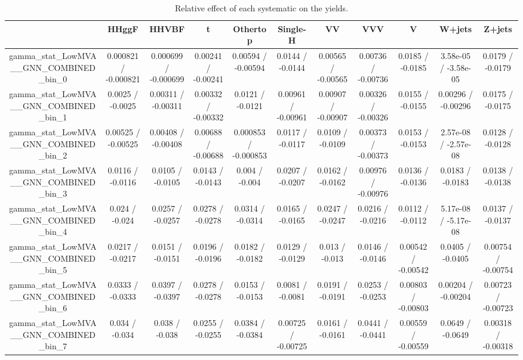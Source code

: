 \documentclass[10pt]{article}
\begin{document}
\begin{table}[htbp]
\begin{center}
\begin{tabular}{|c|c|c|c|c|c|c|c|c|c|c|}
\hline 
      & HHggF      & HHVBF      & t      & Othertop      & Single-H      & VV      & VVV      & V      & W+jets      & Z+jets \\ 
\hline 
  gamma_stat_LowMVA__GNN_COMBINED_bin_0 & 0.000821 / -0.000821 & 0.000699 / -0.000699 & 0.00241 / -0.00241 & 0.00594 / -0.00594 & 0.0144 / -0.0144 & 0.00565 / -0.00565 & 0.00736 / -0.00736 & 0.0185 / -0.0185 & 3.58e-05 / -3.58e-05 & 0.0179 / -0.0179 \\ 
  gamma_stat_LowMVA__GNN_COMBINED_bin_1 & 0.0025 / -0.0025 & 0.00311 / -0.00311 & 0.00332 / -0.00332 & 0.0121 / -0.0121 & 0.00961 / -0.00961 & 0.00907 / -0.00907 & 0.00326 / -0.00326 & 0.0155 / -0.0155 & 0.00296 / -0.00296 & 0.0175 / -0.0175 \\ 
  gamma_stat_LowMVA__GNN_COMBINED_bin_2 & 0.00525 / -0.00525 & 0.00408 / -0.00408 & 0.00688 / -0.00688 & 0.000853 / -0.000853 & 0.0117 / -0.0117 & 0.0109 / -0.0109 & 0.00373 / -0.00373 & 0.0153 / -0.0153 & 2.57e-08 / -2.57e-08 & 0.0128 / -0.0128 \\ 
  gamma_stat_LowMVA__GNN_COMBINED_bin_3 & 0.0116 / -0.0116 & 0.0105 / -0.0105 & 0.0143 / -0.0143 & 0.004 / -0.004 & 0.0207 / -0.0207 & 0.0162 / -0.0162 & 0.00976 / -0.00976 & 0.0136 / -0.0136 & 0.0183 / -0.0183 & 0.0138 / -0.0138 \\ 
  gamma_stat_LowMVA__GNN_COMBINED_bin_4 & 0.024 / -0.024 & 0.0257 / -0.0257 & 0.0278 / -0.0278 & 0.0314 / -0.0314 & 0.0165 / -0.0165 & 0.0247 / -0.0247 & 0.0216 / -0.0216 & 0.0112 / -0.0112 & 5.17e-08 / -5.17e-08 & 0.0137 / -0.0137 \\ 
  gamma_stat_LowMVA__GNN_COMBINED_bin_5 & 0.0217 / -0.0217 & 0.0151 / -0.0151 & 0.0196 / -0.0196 & 0.0182 / -0.0182 & 0.0129 / -0.0129 & 0.013 / -0.013 & 0.0146 / -0.0146 & 0.00542 / -0.00542 & 0.0405 / -0.0405 & 0.00754 / -0.00754 \\ 
  gamma_stat_LowMVA__GNN_COMBINED_bin_6 & 0.0333 / -0.0333 & 0.0397 / -0.0397 & 0.0278 / -0.0278 & 0.0153 / -0.0153 & 0.0081 / -0.0081 & 0.0191 / -0.0191 & 0.0253 / -0.0253 & 0.00803 / -0.00803 & 0.00204 / -0.00204 & 0.00723 / -0.00723 \\ 
  gamma_stat_LowMVA__GNN_COMBINED_bin_7 & 0.034 / -0.034 & 0.038 / -0.038 & 0.0255 / -0.0255 & 0.0384 / -0.0384 & 0.00725 / -0.00725 & 0.0161 / -0.0161 & 0.0441 / -0.0441 & 0.00559 / -0.00559 & 0.0649 / -0.0649 & 0.00318 / -0.00318 \\ 
\hline 
\end{tabular} 
\caption{Relative effect of each systematic on the yields.} 
\end{center} 
\end{table} 
\end{document}
